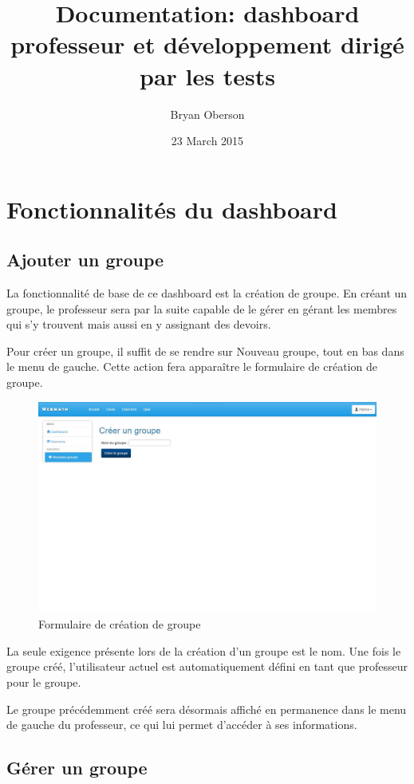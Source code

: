 \documentclass[letterpaper,10pt,french]{sphinxmanual}
\title{Documentation: dashboard professeur et développement dirigé par les tests}
\date{23 March 2015}
\author{Bryan Oberson}
\begin{document}
\maketitle
\tableofcontents
{}\label{index::doc}



\chapter{Fonctionnalités du dashboard}
\label{dashboard:fonctionnalites-du-dashboard}\label{dashboard::doc}\label{dashboard:conception-du-dashboard-professeur-et-developpement-dirige-par-les-tests}

\section{Ajouter un groupe}
\label{dashboard:ajouter-un-groupe}
La fonctionnalité de base de ce dashboard est la création de groupe. En créant
un groupe, le professeur sera par la suite capable de le gérer en gérant les
membres qui s'y trouvent mais aussi en y assignant des devoirs.

Pour créer un groupe, il suffit de se rendre sur Nouveau groupe, tout en bas
dans le menu de gauche. Cette action fera apparaître le formulaire de création
de groupe.
\begin{figure}[htbp]
\centering
\capstart

\includegraphics[width=0.600\linewidth]{Newclass.jpg}
\caption{Formulaire de création de groupe}\end{figure}

La seule exigence présente lors de la création d'un groupe est le nom. Une fois
le groupe créé, l'utilisateur actuel est automatiquement défini en tant que
professeur pour le groupe.

Le groupe précédemment créé sera désormais affiché en permanence dans le menu
de gauche du professeur, ce qui lui permet d'accéder à ses informations.


\section{Gérer un groupe}
\label{dashboard:gerer-un-groupe}
\end{document}
